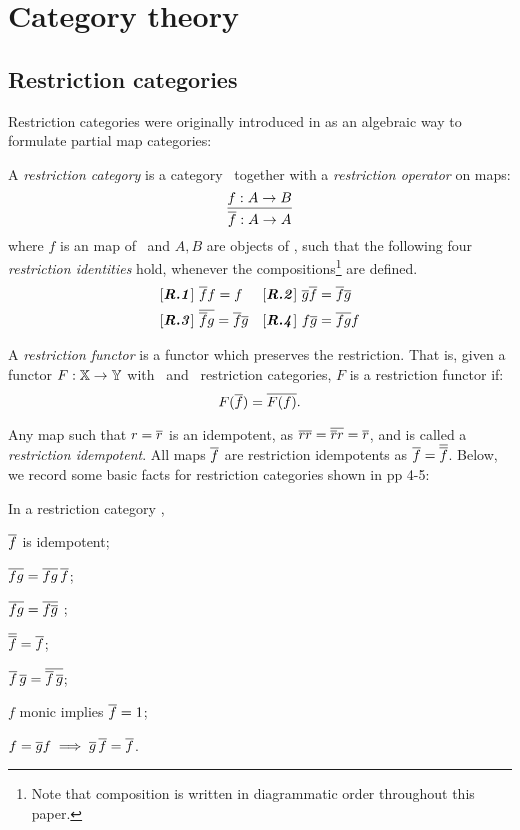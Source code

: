 
\chapter{Category theory}\label{chap:category_theory}
\section{Restriction categories} %
\label{sec:restriction_categories}


Restriction categories were originally introduced in
 \cite{cockett2002:restcategories1} as an algebraic way to formulate
partial map categories:
\begin{definition}A \emph{restriction category}
is a category \X\ together with a \emph{restriction operator} on
maps:
\[
\infer{\restr{f}:A\to A}{f:A \to B}
\]
where $f$ is an map of \X\ and $A,B$ are objects of \X, such that the
following four \emph{restriction identities} hold, whenever the
compositions\footnote{Note that composition is
written in diagrammatic order throughout this paper.} are defined.
\begin{align*}
&[\text{\emph{\bfseries R.1}}]\ \overline{f} f = f & &
[\text{\emph{\textbf{R.2}}}]\ \overline{g}  \overline{f} = \overline{f}  \overline{g}\\
&[\text{\emph{\textbf{R.3}}}]\ \overline{\overline{f}  g} = \overline{f}   \overline{g} & &
[\text{\emph{\textbf{R.4}}}]\  f \overline{g} = \overline{f g} f
\end{align*}
\end{definition}

\begin{definition}
A \emph{restriction functor} is a functor which preserves the restriction. That is,
given a functor $F: \mathbb{X} \to \mathbb{Y}$ with \X\  and \Y\ restriction categories,
$F$ is a restriction functor if:
\[ F(\overline{f}) = \overline{F(f)}.\]
\end{definition}

Any map such that $r=\overline{r}$ is an idempotent, as $\overline{r}\overline{r} = \overline{\overline{r} r} = \overline{r}$,
 and is called a
\emph{restriction idempotent}. All maps $\overline{f}$ are restriction idempotents as
 $\overline{f}=\overline{\overline{f}}$. Below, we record some basic facts for restriction categories
 shown in
\cite{cockett2002:restcategories1} pp 4-5:
\begin{lemma}\label{lem:identities_involving_restriction}
In a restriction category \X,
\bproofenum
\item{}$\overline{f}$ is idempotent;
\item{} $\overline{f g} = \overline{f g} \, \overline{f}$;\label{lemsub:restriction_identities_two}
\item{} $\overline{f g} = \overline{f \overline{g}}$ ;
\item{} $\overline{\overline{f}} = \overline{f}$;
\item{} $\overline{f}\,\overline{g} = \overline{\overline{f}\,\overline{g}}$;
\item{} $f$ monic implies $\overline{f} = 1$;
\item{} $f = \overline{g} f \implies \overline{g}\,\overline{f} = \overline{f}$.
\eproofenum
\end{lemma}

